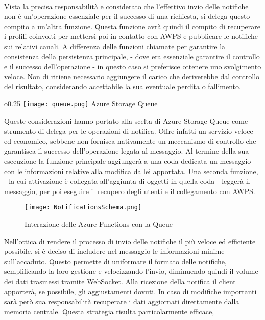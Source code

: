\\
Vista la precisa responsabilità e considerato che 
l'effettivo invio delle notifiche 
non è un'operazione essenziale per il successo di una richiesta,
si delega questo compito a un'altra funzione.
Questa funzione avrà quindi il compito di recuperare i profili coinvolti
per mettersi poi in contatto con AWPS e
pubblicare le notifiche sui relativi canali.
A differenza delle funzioni chiamate per garantire la consistenza della persistenza principale,
- dove era essenziale garantire il controllo e il successo dell'operazione -
in questo caso si preferisce ottenere uno svolgimento veloce.
Non di ritiene necessario aggiungere il carico
che deriverebbe dal controllo del risultato,
considerando accettabile la sua eventuale perdita o fallimento.\\
\begin{wrapfigure}{o}{0.25\textwidth}
    \centering
    \texttt{[image: queue.png]}
    Azure Storage Queue
\end{wrapfigure}
Queste considerazioni hanno portato alla scelta di Azure Storage Queue
come strumento di delega per le operazioni di notifica.
Offre infatti un servizio veloce ed economico, 
sebbene non fornisca nativamente un meccanismo di controllo 
che garantisca il successo dell'operazione legata al messaggio.
Al termine della sua esecuzione la funzione principale aggiungerà
a una coda dedicata un messaggio con le informazioni relative 
alla modifica da lei apportata.
Una seconda funzione,
- la cui attivazione è collegata all'aggiunta di oggetti in quella coda -
leggerà il messaggio, per poi eseguire il recupero degli utenti e il collegamento con AWPS.\\
\begin{figure}[htpb]
    \centering
    \texttt{[image: NotificationsSchema.png]}
    \caption{Interazione delle Azure Functions con la Queue}
\end{figure}
\clearpage
Nell'ottica di rendere il processo di invio delle notifiche
il più veloce ed efficiente possibile, 
si è deciso di includere nel messaggio le informazioni minime sull'accaduto.
Questo permette di uniformare il formato delle notifiche, 
semplificando la loro gestione e velocizzando l'invio,
diminuendo quindi il volume dei dati trasmessi tramite WebSocket.
Alla ricezione della notifica il client apporterà,
se possibile, gli aggiustamenti dovuti.
In caso di modifiche importanti sarà però sua responsabilità 
recuperare i dati aggiornati direttamente dalla memoria centrale.
Questa strategia risulta particolarmente efficace,
